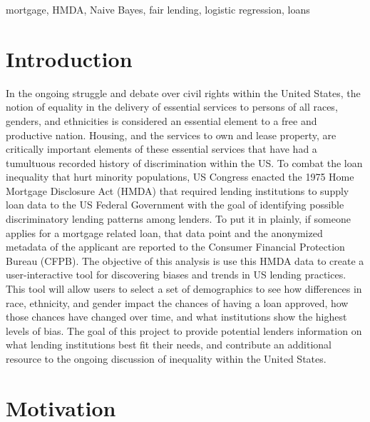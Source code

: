 \documentclass[conference,compsoc]{IEEEtran}
\begin{document}
\begin{keywords}
mortgage, HMDA, Naive Bayes, fair lending, logistic regression, loans
\end{keywords}

%
\IEEEpeerreviewmaketitle



\section{Introduction}

In the ongoing struggle and debate over civil rights within the United States, the notion of equality in the delivery of essential services to persons of all races, genders, and ethnicities is considered an essential element to a free and productive nation. Housing, and the services to own and lease property, are  critically important elements of these essential services that have had a tumultuous recorded history of discrimination within the US. To combat the loan inequality that hurt minority populations, US Congress enacted the 1975 Home Mortgage Disclosure Act (HMDA) that required lending institutions to supply loan data to the US Federal Government with the goal of identifying possible discriminatory lending patterns among lenders.  To put it in plainly, if someone applies for a mortgage related loan, that data point and the anonymized metadata of the applicant are reported to the Consumer Financial Protection Bureau (CFPB). 
The objective of this analysis is use this HMDA data to create a user-interactive tool for discovering biases and trends in US lending practices. This tool will allow users to select a set of demographics to see how differences in race, ethnicity, and gender impact the chances of having a loan approved, how those chances have changed over time, and what institutions show the highest levels of bias. The goal of this project to provide potential lenders information on what lending institutions best fit their needs, and contribute an additional resource to the ongoing discussion of inequality within the United States.

\section{Motivation}
\end{document}

